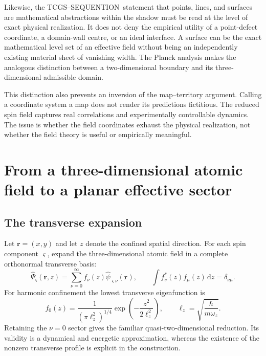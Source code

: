 \documentclass[11pt,a4paper]{article}
\theoremstyle{definition}
\theoremstyle{remark}
\newcommand{\TCGS}{TCGS--SEQUENTION}
\newcommand{\dd}{\mathrm{d}}
\newcommand{\lop}{\ell_z}
\begin{document}
Likewise, the \TCGS\ statement that points, lines, and surfaces are mathematical abstractions within the shadow must be read at the level of exact physical realization. It does not deny the empirical utility of a point-defect coordinate, a domain-wall centre, or an ideal interface. A surface can be the exact mathematical level set of an effective field without being an independently existing material sheet of vanishing width. The Planck analysis makes the analogous distinction between a two-dimensional boundary and its three-dimensional admissible domain.\cite{planck}

This distinction also prevents an inversion of the map--territory argument. Calling a coordinate system a map does not render its predictions fictitious. The reduced spin field captures real correlations and experimentally controllable dynamics. The issue is whether the field coordinates exhaust the physical realization, not whether the field theory is useful or empirically meaningful.\cite{zhang2026,foundation}

\section{From a three-dimensional atomic field to a planar effective sector}
\label{sec:reduction}
\subsection{The transverse expansion}
Let $\boldsymbol r=(x,y)$ and let $z$ denote the confined spatial direction. For each spin component $\varsigma$, expand the three-dimensional atomic field in a complete orthonormal transverse basis:
\begin{equation}
 \widehat\Psi_{\varsigma}(\boldsymbol r,z)
 =\sum_{\nu=0}^{\infty}f_\nu(z)
   \widehat\psi_{\varsigma\nu}(\boldsymbol r),
 \qquad \int f_\nu^*(z)f_\mu(z)\,\dd z=\delta_{\nu\mu}.
 \label{eq:mode_expansion}
\end{equation}
For harmonic confinement the lowest transverse eigenfunction is
\begin{equation}
 f_0(z)=\frac{1}{(\pi\lop^2)^{1/4}}
 \exp\!\left(-\frac{z^2}{2\lop^2}\right),
 \qquad \lop=\sqrt{\frac{\hbar}{m\omega_z}}.
 \label{eq:gaussian}
\end{equation}
Retaining the $\nu=0$ sector gives the familiar quasi-two-dimensional reduction. Its validity is a dynamical and energetic approximation, whereas the existence of the nonzero transverse profile is explicit in the construction.\cite{hadzibabic,petrov}
\end{document}
